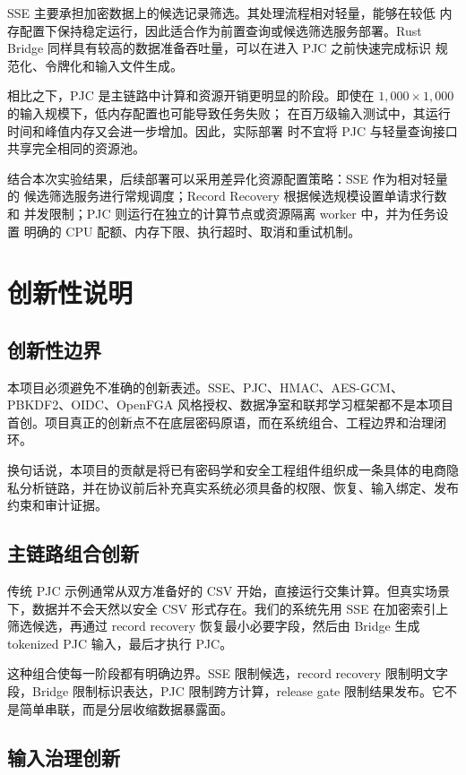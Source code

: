 \documentclass[UTF8,a4paper,12pt,oneside]{ctexrep}
\begin{document}
SSE 主要承担加密数据上的候选记录筛选。其处理流程相对轻量，能够在较低
内存配置下保持稳定运行，因此适合作为前置查询或候选筛选服务部署。Rust
Bridge 同样具有较高的数据准备吞吐量，可以在进入 PJC 之前快速完成标识
规范化、令牌化和输入文件生成。

相比之下，PJC 是主链路中计算和资源开销更明显的阶段。即使在
$1{,}000\times1{,}000$ 的输入规模下，低内存配置也可能导致任务失败；
在百万级输入测试中，其运行时间和峰值内存又会进一步增加。因此，实际部署
时不宜将 PJC 与轻量查询接口共享完全相同的资源池。

结合本次实验结果，后续部署可以采用差异化资源配置策略：SSE 作为相对轻量的
候选筛选服务进行常规调度；Record Recovery 根据候选规模设置单请求行数和
并发限制；PJC 则运行在独立的计算节点或资源隔离 worker 中，并为任务设置
明确的 CPU 配额、内存下限、执行超时、取消和重试机制。




\chapter{创新性说明}

\section{创新性边界}

本项目必须避免不准确的创新表述。SSE、PJC、HMAC、AES-GCM、PBKDF2、OIDC、OpenFGA 风格授权、数据净室和联邦学习框架都不是本项目首创。项目真正的创新点不在底层密码原语，而在系统组合、工程边界和治理闭环。

换句话说，本项目的贡献是将已有密码学和安全工程组件组织成一条具体的电商隐私分析链路，并在协议前后补充真实系统必须具备的权限、恢复、输入绑定、发布约束和审计证据。

\section{主链路组合创新}

传统 PJC 示例通常从双方准备好的 CSV 开始，直接运行交集计算。但真实场景下，数据并不会天然以安全 CSV 形式存在。我们的系统先用 SSE 在加密索引上筛选候选，再通过 record recovery 恢复最小必要字段，然后由 Bridge 生成 tokenized PJC 输入，最后才执行 PJC。

这种组合使每一阶段都有明确边界。SSE 限制候选，record recovery 限制明文字段，Bridge 限制标识表达，PJC 限制跨方计算，release gate 限制结果发布。它不是简单串联，而是分层收缩数据暴露面。

\section{输入治理创新}
\end{document}

